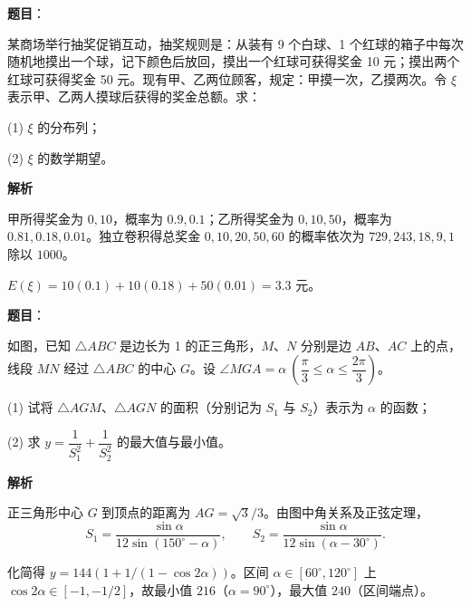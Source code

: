 \begin{answer}

\textbf{题目}：

某商场举行抽奖促销互动，抽奖规则是：从装有 9 个白球、1 个红球的箱子中每次随机地摸出一个球，记下颜色后放回，摸出一个红球可获得奖金 10 元；摸出两个红球可获得奖金 50 元。现有甲、乙两位顾客，规定：甲摸一次，乙摸两次。令 $\xi$ 表示甲、乙两人摸球后获得的奖金总额。求：

(1) $\xi$ 的分布列；

(2) $\xi$ 的数学期望。

\textbf{解析}


甲所得奖金为 $0,10$，概率为 $0.9,0.1$；乙所得奖金为 $0,10,50$，概率为 $0.81,0.18,0.01$。独立卷积得总奖金 $0,10,20,50,60$ 的概率依次为 $729,243,18,9,1$ 除以 $1000$。


$E(\xi)=10(0.1)+10(0.18)+50(0.01)=3.3$ 元。



\end{answer}
\begin{answer}

\textbf{题目}：

如图，已知 $\triangle ABC$ 是边长为 1 的正三角形，$M\text{、}N$ 分别是边 $AB\text{、}AC$ 上的点，线段 $MN$ 经过 $\triangle ABC$ 的中心 $G$。设 $\angle MGA=\alpha\ \left(\dfrac\pi3\leqslant\alpha\leqslant\dfrac{2\pi}3\right)$。

(1) 试将 $\triangle AGM\text{、}\triangle AGN$ 的面积（分别记为 $S_1$ 与 $S_2$）表示为 $\alpha$ 的函数；

(2) 求 $y=\dfrac1{S_1^2}+\dfrac1{S_2^2}$ 的最大值与最小值。
\nopagebreak[4]
\begin{center}\end{center}
\nopagebreak[4]
\textbf{解析}


正三角形中心 $G$ 到顶点的距离为 $AG=\sqrt3/3$。由图中角关系及正弦定理，
\nopagebreak[4]
\[
S_1=\frac{\sin\alpha}{12\sin(150^\circ-\alpha)},\qquad
S_2=\frac{\sin\alpha}{12\sin(\alpha-30^\circ)}.
\]


化简得 $y=144(1+1/(1-\cos2\alpha))$。区间 $\alpha\in[60^\circ,120^\circ]$ 上 $\cos2\alpha\in[-1,-1/2]$，故最小值 $216$（$\alpha=90^\circ$），最大值 $240$（区间端点）。



\end{answer}
